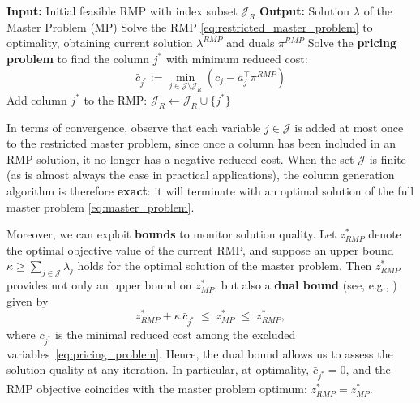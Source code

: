 \documentclass{book}
\theoremstyle{definition}
\newcounter{algorithm_}
\numberwithin{algorithm_}{chapter}
\begin{document}
\bigskip

\begin{tcolorbox}[colback=gray!10!white, colframe=gray!80!black,
                  title= Algorithm 1.1: Column Generation Algorithm, sharp corners, boxrule=0.8pt]
{\small
\begin{algorithmic}[1]
\State \textbf{Input:} Initial feasible RMP with index subset $\mathcal{J}_R$
\State \textbf{Output:} Solution $\lambda$ of the Master Problem (MP)
\Repeat
    \State Solve the RMP \eqref{eq:restricted_master_problem} to optimality, obtaining current solution $\lambda^{RMP}$ and duals $\pi^{RMP}$
    \State Solve the \textbf{pricing problem} to find the column $j^*$ with minimum reduced cost:
           \[
           \bar{c}_{j^*} := \min_{j \in \mathcal{J} \setminus \mathcal{J}_R} \left( c_j - a_j^\top \pi^{RMP} \right)
           \]
        \State Add column $j^*$ to the RMP: $\mathcal{J}_R \gets \mathcal{J}_R \cup \{ j^* \}$
    \EndIf
{}
\end{algorithmic}
} \label{alg:colgen}
\end{tcolorbox} 

\bigskip

In terms of convergence, observe that each variable $j \in \mathcal{J}$ is added at most once to the restricted master problem, since once a column has been included in an RMP solution, it no longer has a negative reduced cost.  
When the set $\mathcal{J}$ is finite (as is almost always the case in practical applications), the column generation algorithm is therefore \textbf{exact}: it will terminate with an optimal solution of the full master problem \eqref{eq:master_problem}.  

\medskip

Moreover, we can exploit \textbf{bounds} to monitor solution quality.  
Let $z_{RMP}^*$ denote the optimal objective value of the current RMP, and suppose an upper bound $\kappa \ge \sum_{j \in \mathcal{J}} \lambda_j$ holds for the optimal solution of the master problem.  
Then $z_{RMP}^*$ provides not only an upper bound on $z_{MP}^*$, but also a \textbf{dual bound} (see, e.g., \cite{Lubbecke2011}) given by
\begin{equation}\label{eq:cg_dual_bound}
z_{RMP}^* + \kappa \, \bar{c}_{j^*} \;\le\; z_{MP}^* \;\le\; z_{RMP}^*,
\end{equation}
where $\bar{c}_{j^*}$ is the minimal reduced cost among the excluded variables~\eqref{eq:pricing_problem}.  
Hence, the dual bound allows us to assess the solution quality at any iteration.  
In particular, at optimality, $\bar{c}_{j^*} = 0$, and the RMP objective coincides with the master problem optimum: $z_{RMP}^* = z_{MP}^*$.
\end{document}

